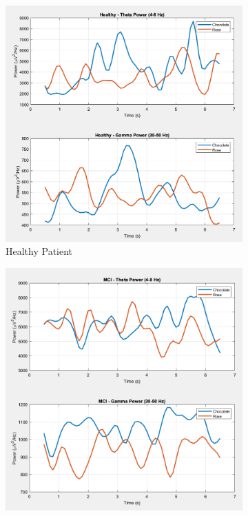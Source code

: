 \documentclass[hidelinks,12pt]{article}
\begin{document}
	\begin{figure}[!h]
		\centering
		\begin{subfigure}{0.32\textwidth}
			\centering
			\includegraphics[height=\linewidth]{plots/5}
			\caption{Healthy Patient}
		\end{subfigure}
		\hfill
		\begin{subfigure}{0.32\textwidth}
			\centering
			\includegraphics[height=\linewidth]{plots/6}

\end{subfigure}
\end{figure}
\end{document}
